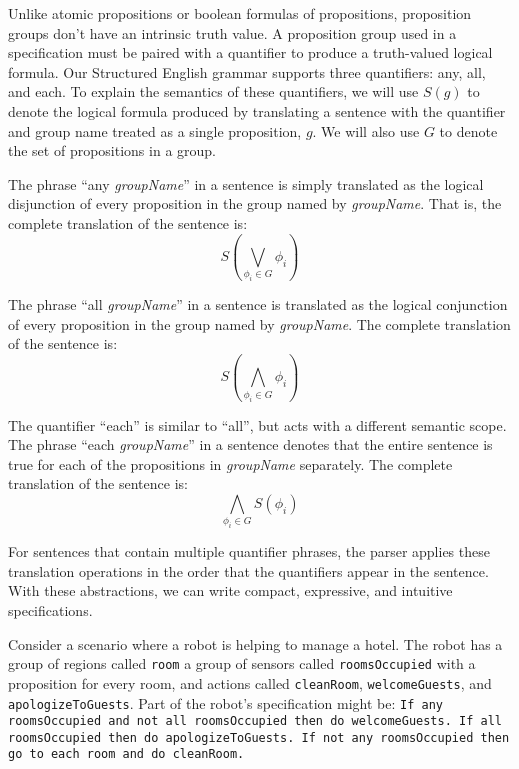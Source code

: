 Unlike atomic propositions or boolean formulas of propositions, proposition groups don't have an intrinsic truth value. A proposition group used in a specification must be paired with a quantifier to produce a truth-valued logical formula. Our Structured English grammar supports three quantifiers: any, all, and each. To explain the semantics of these quantifiers, we will use $S(g)$ to denote the logical formula produced by translating a sentence with the quantifier and group name treated as a single proposition, $g$. We will also use $G$ to denote the set of propositions in a group. 
\par
The phrase ``any \textit{groupName}'' in a sentence is simply translated as the logical disjunction of every proposition in the group named by \textit{groupName}. That is, the complete translation of the sentence is: 
\begin{equation*}
	S( \bigvee \limits_{\phi_i \in G} \phi_i )
\end{equation*}
\par
The phrase ``all \textit{groupName}'' in a sentence is translated as the logical conjunction of every proposition in the group named by \textit{groupName}. The complete translation of the sentence is: 
\begin{equation*}
	S( \bigwedge \limits_{\phi_i \in G} \phi_i )
\end{equation*}
\par
The quantifier ``each'' is similar to ``all'', but acts with a different semantic scope. The phrase ``each \textit{groupName}'' in a sentence denotes that the entire sentence is true for each of the propositions in \textit{groupName} separately. The complete translation of the sentence is:
\begin{equation*}
 	\bigwedge\limits_{\phi_i \in G} S(\phi_i)
\end{equation*}
\par
For sentences that contain multiple quantifier phrases, the parser applies these translation operations in the order that the quantifiers appear in the sentence. With these abstractions, we can write compact, expressive, and intuitive specifications. 
\par
\begin{myExample}\label{Ex:quantifiers} 	
	Consider a scenario where a robot is helping to manage a hotel. The robot has a group of regions called \texttt{room} a group of sensors called \texttt{roomsOccupied} with a proposition for every room, and actions called \texttt{cleanRoom}, \texttt{welcomeGuests}, and \texttt{apologizeToGuests}. Part of the robot's specification might be: \texttt{If any roomsOccupied and not all roomsOccupied then do welcomeGuests. If all roomsOccupied then do apologizeToGuests. If not any roomsOccupied then go to each room and do cleanRoom. } 
\end{myExample}

